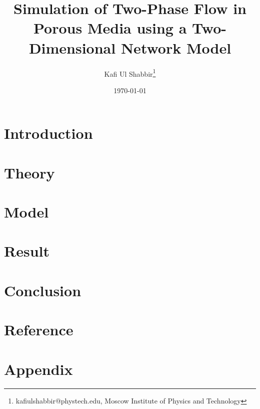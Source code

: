 \documentclass[12pt]{report}
\title{Simulation of Two-Phase Flow in Porous Media using a Two-Dimensional Network Model}
\author{Kafi Ul Shabbir\thanks{kafiulshabbir@phystech.edu, Moscow Institute of Physics and Technology}}
\date{\today}
\begin{document}
\maketitle

\tableofcontents

\chapter{Introduction}
	
	
\chapter{Theory}
	
	
\chapter{Model}
	

\chapter{Result}
	

\chapter{Conclusion}
	

\chapter{Reference}
	
	
\chapter{Appendix}
	
\end{document}
